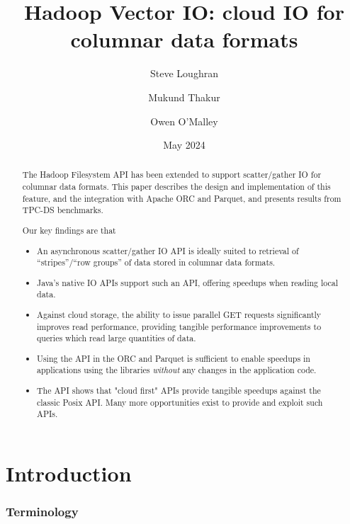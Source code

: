 \documentclass[manuscript]{acmart}
\title[Hadoop Vector IO]{Hadoop Vector IO: cloud IO for columnar data formats}
\author{Steve Loughran}
\author{Mukund Thakur}
\author{Owen O'Malley}
\date{May 2024}
\begin{document}

\begin{abstract}
The Hadoop Filesystem API has been extended to support scatter/gather IO
for columnar data formats.
This paper describes the design and implementation of this feature,
and the integration with Apache ORC and Parquet, and
presents results from TPC-DS benchmarks.

Our key findings are that
\begin{itemize}
  \item An asynchronous scatter/gather IO API is ideally suited to retrieval
  of ``stripes''/``row groups'' of data stored in columnar data formats.
  \item Java's native IO APIs support such an API, offering speedups when reading
  local data.
  \item Against cloud storage, the ability to issue parallel GET requests
        significantly improves read performance, providing tangible performance
        improvements to queries which read large quantities of data.
  \item Using the API in the ORC and Parquet is sufficient to enable
        speedups in applications using the libraries \emph{without} any
        changes in the application code.
  \item The API shows that "cloud first" APIs provide tangible speedups
        against the classic Posix API. Many more opportunities exist to
        provide and exploit such APIs.
\end{itemize}

\end{abstract}



\maketitle


\section{Introduction}
\label{sec:introduction}



\subsubsection{Terminology}
\end{document}
